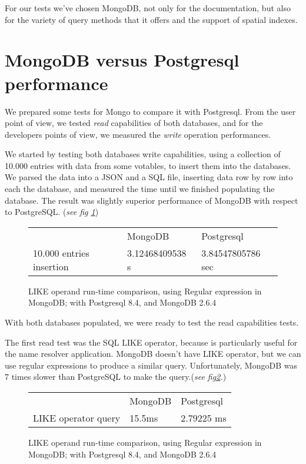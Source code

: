 \documentclass[11pt,twoside]{article}
\begin{document}
    For our tests we've chosen MongoDB, not only for the documentation, but also
    for the variety of query methods that it offers and the support of spatial indexes.


\section{MongoDB versus Postgresql performance}
    We prepared some tests for Mongo to compare it with Postgresql. From the user
    point of view, we tested \emph{read} capabilities of both databases, and
    for the developers points of view, we measured the \emph{write} operation
    performances.
    
    We started by testing both databases write capabilities, using a collection of 10.000 entries with data from some votables,
    to insert them into the databases. We parsed the data into a JSON and a SQL file, 
    inserting data row by row into each the database, and measured the time until we 
    finished populating the database. The result was slightly superior
    performance of MongoDB with respect to PostgreSQL. (\emph{see fig \ref{fig:insert}})
    
 \begin{figure}
    \centering
    \begin{tabular}{lll}    
                        & MongoDB & Postgresql \\
    10.000 entries insertion & 3.12468409538 s  & 3.84547805786 sec
    \end{tabular}
    \caption{LIKE operand run-time comparison, using Regular expression in MongoDB; with Postgresql 8.4, and MongoDB 2.6.4}
    \label{fig:insert}
\end{figure}   
    
    With both databases populated, we were ready to test the read capabilities tests.
    
    The first read test was the SQL LIKE operator, because is particularly
    useful for the name resolver application. 
    MongoDB doesn't have LIKE operator, but we can use regular expressions to
    produce a similar query. Unfortunately, MongoDB was 7 times slower than
    PostgreSQL to make the query.(\emph{see fig\ref{fig:like}.})
\begin{figure}
    \centering
    \begin{tabular}{lll}    
                        & MongoDB & Postgresql \\
    LIKE operator query & 15.5ms  & 2.79225 ms
    \end{tabular}
    \caption{LIKE operand run-time comparison, using Regular expression in MongoDB; with Postgresql 8.4, and MongoDB 2.6.4}
    \label{fig:like}
\end{figure}
\end{document}

